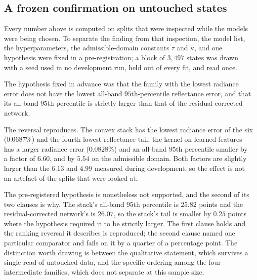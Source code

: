 \subsection{A frozen confirmation on untouched states}
\label{sec:confirm}

Every number above is computed on splits that were inspected while the models were being
chosen. To separate the finding from that inspection, the model list, the hyperparameters,
the admissible-domain constants $\tau$ and $\kappa$, and one hypothesis were fixed in a
pre-registration; a block of $3{,}497$ states was drawn with a seed used in no development
run, held out of every fit, and read once.

The hypothesis fixed in advance was that the family with the lowest radiance error does not
have the lowest all-band $95$th-percentile reflectance error, and that its all-band
$95$th percentile is strictly larger than that of the residual-corrected network.


The reversal reproduces. The convex stack has the lowest radiance error of the six
($0.0687\%$) and the fourth-lowest reflectance tail; the kernel on learned features has a
larger radiance error ($0.0828\%$) and an all-band $95$th percentile smaller by a factor of
$6.60$, and by $5.54$ on the admissible domain. Both factors are slightly larger than the
$6.13$ and $4.99$ measured during development, so the effect is not an artefact of the
splits that were looked at.

The pre-registered hypothesis is nonetheless not supported, and the second of its two
clauses is why. The stack's all-band $95$th percentile is $25.82$ points and the
residual-corrected network's is $26.07$, so the stack's tail is smaller by $0.25$ points
where the hypothesis required it to be strictly larger. The first clause holds and the
ranking reversal it describes is reproduced; the second clause named one particular
comparator and fails on it by a quarter of a percentage point. The distinction worth
drawing is between the qualitative statement, which survives a single read of untouched
data, and the specific ordering among the four intermediate families, which does not
separate at this sample size.
